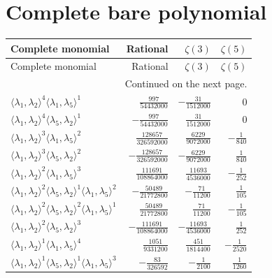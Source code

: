 \section{Complete bare polynomial}
\begin{longtable}{@{}lrrr@{}}
\toprule
Complete monomial & Rational & $\zeta(3)$ & $\zeta(5)$ \\
\midrule\endfirsthead
\toprule Complete monomial & Rational & $\zeta(3)$ & $\zeta(5)$ \\
\midrule\endhead
\midrule\multicolumn{4}{r}{Continued on the next page.}\\\endfoot
\bottomrule\endlastfoot
$\langle\lambda_1,\lambda_2\rangle^{4}\langle\lambda_1,\lambda_5\rangle^{1}$ & $\frac{997}{54432000}$ & $-\frac{31}{1512000}$ & $0$ \\
$\langle\lambda_1,\lambda_2\rangle^{4}\langle\lambda_5,\lambda_2\rangle^{1}$ & $-\frac{997}{54432000}$ & $\frac{31}{1512000}$ & $0$ \\
$\langle\lambda_1,\lambda_2\rangle^{3}\langle\lambda_1,\lambda_5\rangle^{2}$ & $\frac{128657}{326592000}$ & $\frac{6229}{9072000}$ & $-\frac{1}{840}$ \\
$\langle\lambda_1,\lambda_2\rangle^{3}\langle\lambda_5,\lambda_2\rangle^{2}$ & $-\frac{128657}{326592000}$ & $-\frac{6229}{9072000}$ & $\frac{1}{840}$ \\
$\langle\lambda_1,\lambda_2\rangle^{2}\langle\lambda_1,\lambda_5\rangle^{3}$ & $\frac{111691}{108864000}$ & $\frac{11693}{4536000}$ & $-\frac{1}{252}$ \\
$\langle\lambda_1,\lambda_2\rangle^{2}\langle\lambda_5,\lambda_2\rangle^{1}\langle\lambda_1,\lambda_5\rangle^{2}$ & $-\frac{50489}{21772800}$ & $-\frac{71}{11200}$ & $\frac{1}{105}$ \\
$\langle\lambda_1,\lambda_2\rangle^{2}\langle\lambda_5,\lambda_2\rangle^{2}\langle\lambda_1,\lambda_5\rangle^{1}$ & $\frac{50489}{21772800}$ & $\frac{71}{11200}$ & $-\frac{1}{105}$ \\
$\langle\lambda_1,\lambda_2\rangle^{2}\langle\lambda_5,\lambda_2\rangle^{3}$ & $-\frac{111691}{108864000}$ & $-\frac{11693}{4536000}$ & $\frac{1}{252}$ \\
$\langle\lambda_1,\lambda_2\rangle^{1}\langle\lambda_1,\lambda_5\rangle^{4}$ & $\frac{1051}{9331200}$ & $\frac{451}{1814400}$ & $-\frac{1}{2520}$ \\
$\langle\lambda_1,\lambda_2\rangle^{1}\langle\lambda_5,\lambda_2\rangle^{1}\langle\lambda_1,\lambda_5\rangle^{3}$ & $-\frac{83}{326592}$ & $-\frac{1}{2100}$ & $\frac{1}{1260}$ \\

\end{longtable}
